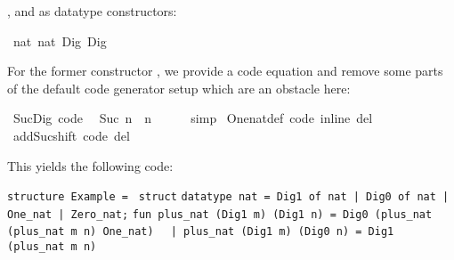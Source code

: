 \begin{isabellebody}
\begin{isamarkuptext}
  ,  and  as
  datatype constructors:%
\end{isamarkuptext}%
\isamarkuptrue%
%
\isadelimquoteme
%
\endisadelimquoteme
%
\isatagquoteme
{}\isamarkupfalse%
\ {\isachardoublequoteopen}{}{\isasymColon}nat{\isachardoublequoteclose}\ {\isachardoublequoteopen}{}{\isasymColon}nat{\isachardoublequoteclose}\ Dig{}\ Dig{}%
\endisatagquoteme
{\isafoldquoteme}%
%
\isadelimquoteme
%
\endisadelimquoteme
%
\begin{isamarkuptext}%
\noindent For the former constructor , we provide a code
  equation and remove some parts of the default code generator setup
  which are an obstacle here:%
\end{isamarkuptext}%
\isamarkuptrue%
%
\isadelimquoteme
%
\endisadelimquoteme
%
\isatagquoteme
{}\isamarkupfalse%
\ Suc{\isacharunderscore}Dig\ {\isacharbrackleft}code{\isacharbrackright}{\isacharcolon}\isanewline
\ \ {\isachardoublequoteopen}Suc\ n\ {\isacharequal}\ n\ {\isacharplus}\ {}{\isachardoublequoteclose}\isanewline
\ \ \isamarkupfalse%
\ simp\isanewline
\isanewline
{}\isamarkupfalse%
\ One{\isacharunderscore}nat{\isacharunderscore}def\ {\isacharbrackleft}code\ inline\ del{\isacharbrackright}\isanewline
{}\isamarkupfalse%
\ add{\isacharunderscore}Suc{\isacharunderscore}shift\ {\isacharbrackleft}code\ del{\isacharbrackright}%
\endisatagquoteme
{\isafoldquoteme}%
%
\isadelimquoteme
%
\endisadelimquoteme
%
\begin{isamarkuptext}%
\noindent This yields the following code:%
\end{isamarkuptext}%
\isamarkuptrue%
%
\isadelimquoteme
%
\endisadelimquoteme
%
\isatagquoteme
%
\begin{isamarkuptext}%
\isaverbatim%
\noindent%
\verb|structure Example = |\newline%
\verb|struct|\newline%
\newline%
\verb|datatype nat = Dig1 of nat |\verb,|,\verb| Dig0 of nat |\verb,|,\verb| One_nat |\verb,|,\verb| Zero_nat;|\newline%
\newline%
\verb|fun plus_nat (Dig1 m) (Dig1 n) = Dig0 (plus_nat (plus_nat m n) One_nat)|\newline%
\verb|  |\verb,|,\verb| plus_nat (Dig1 m) (Dig0 n) = Dig1 (plus_nat m n)|\newline%

\end{isamarkuptext}
\end{isabellebody}
